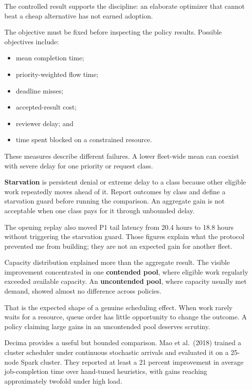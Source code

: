 The controlled result supports the discipline: an elaborate optimizer that cannot beat a cheap alternative has not earned adoption.


The objective must be fixed before inspecting the policy results. Possible objectives include:

\begin{itemize}
\tightlist
\item
  mean completion time;
\item
  priority-weighted flow time;
\item
  deadline misses;
\item
  accepted-result cost;
\item
  reviewer delay; and
\item
  time spent blocked on a constrained resource.
\end{itemize}

These measures describe different failures. A lower fleet-wide mean can coexist with severe delay for one priority or request class.

\textbf{Starvation} is persistent denial or extreme delay to a class because other eligible work repeatedly moves ahead of it. Report outcomes by class and define a starvation guard before running the comparison. An aggregate gain is not acceptable when one class pays for it through unbounded delay.

The opening replay also moved P1 tail latency from 20.4 hours to 18.8 hours without triggering the starvation guard. Those figures explain what the protocol prevented me from building; they are not an expected gain for another fleet.

Capacity distribution explained more than the aggregate result. The visible improvement concentrated in one \textbf{contended pool}, where eligible work regularly exceeded available capacity. An \textbf{uncontended pool}, where capacity usually met demand, showed almost no difference across policies.

That is the expected shape of a genuine scheduling effect. When work rarely waits for a resource, queue order has little opportunity to change the outcome. A policy claiming large gains in an uncontended pool deserves scrutiny.

Decima provides a useful but bounded comparison. Mao et al.~(2018) trained a cluster scheduler under continuous stochastic arrivals and evaluated it on a 25-node Spark cluster. They reported at least a 21 percent improvement in average job-completion time over hand-tuned heuristics, with gains reaching approximately twofold under high load.

